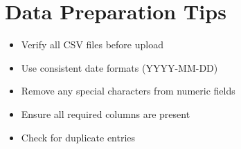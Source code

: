 \section{Data Preparation Tips}

\begin{itemize}
	\item Verify all CSV files before upload
	\item Use consistent date formats (YYYY-MM-DD)
	\item Remove any special characters from numeric fields
	\item Ensure all required columns are present
	\item Check for duplicate entries
\end{itemize}
